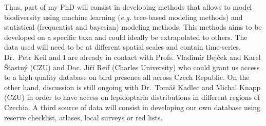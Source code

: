 \documentclass[
  12pt,
  oneside]{report}
\begin{document}
Thus, part of my PhD will consist in developing methods that allows to model biodiversity using machine learning (\emph{e.g.} tree-based modeling methods) and statistical (frequentist and bayesian) modeling methods. This methods aims to be developed on a specific taxa and could ideally be extrapolated to others. The data used will need to be at different spatial scales and contain time-series. Dr.~Petr Keil and I are already in contact with Profs. Vladimír Bejček and Karel Šťastný (CZU) and Doc. Jiří Reif (Charles University) who could grant us access to a high quality database on bird presence all across Czech Republic. On the other hand, discussion is still ongoing with Dr.~Tomáš Kadlec and Michal Knapp (CZU) in order to have access on lepidoptaria distributions in different regions of Czechia. A third source of data will consist in developing our own database using reserve checklist, atlases, local surveys or red lists.


\singlespacing %
\printbibliography[title=References]
\end{document}

